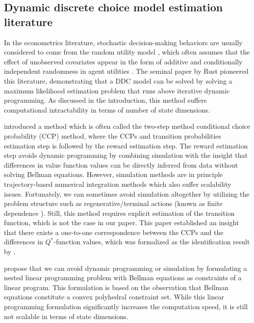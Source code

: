 \subsection{Dynamic discrete choice model estimation literature}
In the econometrics literature, stochastic decision-making behaviors are usually considered to come from the random utility model \citep{mcfadden2001economic}, which often assumes that the effect of unobserved covariates appear in the form of additive and conditionally independent randomness in agent utilities \cite{rust1994structural}.  
The seminal paper by Rust \citep{rust1987optimal} pioneered this literature, demonstrating that a DDC model can be solved by solving a maximum likelihood estimation problem that runs above iterative dynamic programming. As discussed in the introduction, this method suffers computational intractability in terms of number of state dimensions.

\cite{hotz1993conditional} introduced a method which is often called the two-step method conditional choice probability (CCP) method, where the CCPs and transition probabilities estimation step is followed by the reward estimation step. The reward estimation step avoids dynamic programming by combining simulation with the insight that differences in value function values can be directly inferred from data without solving Bellman equations. However, simulation methods are in principle trajectory-based numerical integration methods which also suffer scalability issues. Fortunately, we can sometimes avoid simulation altogether by utilizing the problem structure such as regenerative/terminal actions (known as finite dependence \citep{arcidiacono2011conditional}). Still, this method requires explicit estimation of the transition function, which is not the case in our paper. This paper established an insight that there exists a one-to-one correspondence between the CCPs and the differences in $Q^*$-function values, which was formalized as the identification result by \cite{magnac2002identifying}. 

\cite{su2012constrained} propose that we can avoid dynamic programming or simulation by formulating a nested linear programming problem with Bellman equations as constraints of a linear program. This formulation is based on the observation that Bellman equations constitute a convex polyhedral constraint set. While this linear programming formulation significantly increases the computation speed, it is still not scalable in terms of state dimensions.

